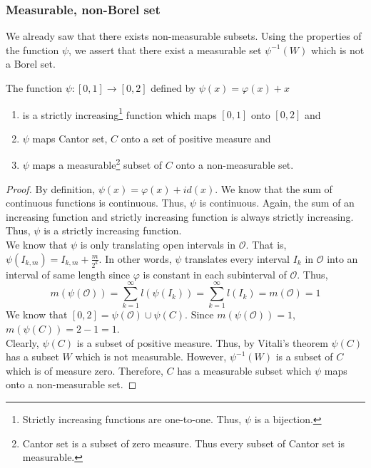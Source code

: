 \subsubsection{Measurable, non-Borel set}
	We already saw that there exists non-measurable subsets.
	Using the properties of the function $\psi$, we assert that there exist a measurable set $\psi^{-1}(W)$ which is not a Borel set.
\begin{theorem}
	The function $\psi : [0,1] \to [0,2]$ defined by $\psi(x) = \varphi(x)+x$
	\begin{enumerate}
		\item is a strictly increasing\dag\footnote{
				Strictly increasing functions are one-to-one.
				Thus, $\psi$ is a bijection.}
			function which maps $[0,1]$ onto $[0,2]$ and
		\item $\psi$ maps Cantor set, $C$ onto a set of positive measure and
		\item $\psi$ maps a measurable\dag\footnote{
			Cantor set is a subset of zero measure.
			Thus every subset of Cantor set is measurable.}
		subset of $C$ onto a non-measurable set.
	\end{enumerate}
\end{theorem}
\begin{proof}
	By definition, $\psi(x) = \varphi(x) + id(x)$.
	We know that the sum of continuous functions is continuous.
	Thus, $\psi$ is continuous.
	Again, the sum of an increasing function and strictly increasing function is always strictly increasing.
	Thus, $\psi$ is a strictly increasing function.\\

	We know that $\psi$ is only translating open intervals in $\mathcal{O}$.
	That is, $\psi(I_{k,m}) = I_{k,m} + \frac{m}{2^k}$.
	In other words, $\psi$ translates every interval $I_k$ in $\mathcal{O}$ into an interval of same length since $\varphi$ is constant in each subinterval of $\mathcal{O}$.
	Thus, $$\displaystyle m(\psi(\mathcal{O})) = \sum_{k=1}^\infty l(\psi(I_k)) = \sum_{k=1}^\infty l(I_k) = m(\mathcal{O}) = 1$$
	We know that $[0,2] = \psi(\mathcal{O}) \cup \psi(C)$.
	Since $m(\psi(\mathcal{O})) = 1$, $m(\psi(C)) = 2-1 = 1$.\\

	Clearly, $\psi(C)$ is a subset of positive measure.
	Thus, by Vitali's theorem $\psi(C)$ has a subset $W$ which is not measurable.
	However, $\psi^{-1}(W)$ is a subset of $C$ which is of measure zero.
	Therefore, $C$ has a measurable subset which $\psi$ maps onto a non-measurable set.
\end{proof}

